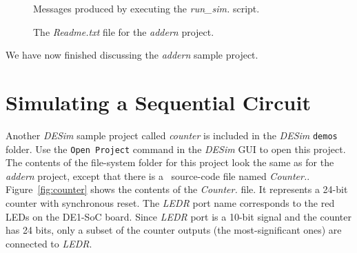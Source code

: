 \begin{figure}[h]
	\begin{center}
        \setlength{\fboxsep}{0pt}
	\end{center}
          \caption{Messages produced by executing the {\it run\_sim.} script.}
	\label{fig:sim}
\end{figure}

\begin{figure}[H]
\begin{center}
\begin{minipage}[t]{15 cm}
	
\end{minipage}
    \caption{The {\it Readme.txt} file for the {\it addern} project.}
	\label{fig:readme}
\end{center}
\end{figure}

We have now finished discussing the {\it addern} sample project.

\section{Simulating a Sequential Circuit}

Another {\it DESim} sample project called {\it counter} is included in the {\it DESim}
\texttt{demos} folder. Use the \texttt{Open Project} command in the {\it DESim} GUI to open this
project. The contents of the file-system folder for this project look the same as for the 
{\it addern} project, except that there is a \hdlName~source-code file named {\it Counter.\hdlFileExt}. 
Figure~\ref{fig:counter} shows the contents of the {\it Counter.\hdlFileExt} file. It represents a 
24-bit counter with synchronous reset. The {\it LEDR} port name corresponds to the red LEDs
on the DE1-SoC board. Since {\it LEDR} port is a 10-bit signal and the 
counter has 24 bits, only a subset of the counter outputs (the most-significant ones) are 
connected to {\it LEDR}.

